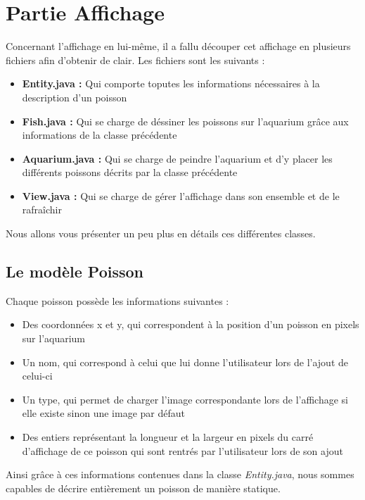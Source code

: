 \section{Partie Affichage}
Concernant l'affichage en lui-même, il a fallu découper cet affichage en plusieurs fichiers afin d'obtenir de clair. Les fichiers sont les suivants :
\begin{itemize}
\item{\textbf{Entity.java :} Qui comporte toputes les informations nécessaires à la description d'un poisson}
\item{\textbf{Fish.java : }Qui se charge de déssiner les poissons sur l'aquarium grâce aux informations de la classe précédente}
\item{\textbf{Aquarium.java : }Qui se charge de peindre l'aquarium et d'y placer les différents poissons décrits par la classe précédente}
\item{\textbf{View.java : }Qui se charge de gérer l'affichage dans son ensemble et de le rafraîchir}
\end{itemize}
Nous allons vous présenter un peu plus en détails ces différentes classes.
\subsection{Le modèle Poisson}
Chaque poisson possède les informations suivantes :
\begin{itemize}
\item{Des coordonnées x et y, qui correspondent à la position d'un poisson en pixels sur l'aquarium}
\item{Un nom, qui correspond à celui que lui donne l'utilisateur lors de l'ajout de celui-ci}
\item{Un type, qui permet de charger l'image correspondante lors de l'affichage si elle existe sinon une image par défaut}
\item{Des entiers représentant la longueur et la largeur en pixels du carré d'affichage de ce poisson qui sont rentrés par l'utilisateur lors de son ajout}
\end{itemize}
Ainsi grâce à ces informations contenues dans la classe \textit{Entity.java}, nous sommes capables de décrire entièrement un poisson de manière statique.


